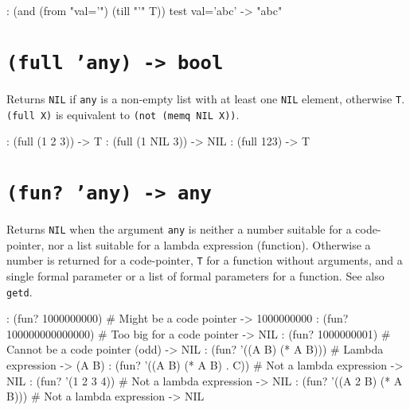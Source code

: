 \begin{wideverbatim}
: (and (from "val='") (till "'" T))
test val='abc'
-> "abc"
\end{wideverbatim}

 
\section*{\texttt{(full 'any) -> bool}}
\label{sec:func-ref-F-(full 'any) -> bool}


Returns \texttt{NIL} if \texttt{any} is a non-empty list with at least one \texttt{NIL}
element, otherwise \texttt{T}. \texttt{(full X)} is equivalent to
\texttt{(not (memq NIL X))}.


\begin{wideverbatim}
: (full (1 2 3))
-> T
: (full (1 NIL 3))
-> NIL
: (full 123)
-> T
\end{wideverbatim}

 
\section*{\texttt{(fun? 'any) -> any}}
\label{sec:func-ref-F-(fun? 'any) -> any}


Returns \texttt{NIL} when the argument \texttt{any} is neither a number suitable for a
code-pointer, nor a list suitable for a lambda expression (function).
Otherwise a number is returned for a code-pointer, \texttt{T} for a function
without arguments, and a single formal parameter or a list of formal
parameters for a function. See also \texttt{getd}.


\begin{wideverbatim}
: (fun? 1000000000)              # Might be a code pointer
-> 1000000000
: (fun? 100000000000000)         # Too big for a code pointer
-> NIL
: (fun? 1000000001)              # Cannot be a code pointer (odd)
-> NIL
: (fun? '((A B) (* A B)))        # Lambda expression
-> (A B)
: (fun? '((A B) (* A B) . C))    # Not a lambda expression
-> NIL
: (fun? '(1 2 3 4))              # Not a lambda expression
-> NIL
: (fun? '((A 2 B) (* A B)))      # Not a lambda expression
-> NIL
\end{wideverbatim}



% 
